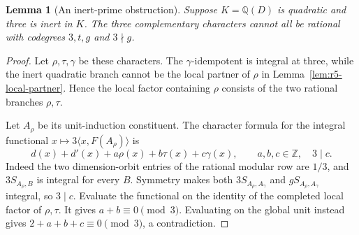 \documentclass[11pt,a4paper]{article}
\newtheorem{lemma}[theorem]{Lemma}
\numberwithin{equation}{section}
\begin{document}
\begin{lemma}[An inert-prime obstruction]
\label{lem:quadratic-inert-three}
Suppose $K=\mathbb Q(D)$ is quadratic and three is inert in $K$.
The three complementary characters cannot all be rational with
codegrees $3,t,g$ and $3\nmid g$.
\end{lemma}
\begin{proof}
Let $\rho,\tau,\gamma$ be these characters. The $\gamma$-idempotent
is integral at three, while the inert quadratic branch cannot be the
local partner of $\rho$ in Lemma~\ref{lem:r5-local-partner}.
Hence the local factor containing $\rho$ consists of the two rational
branches $\rho,\tau$.

Let $A_\rho$ be its unit-induction constituent. The character formula
for the integral functional $x\mapsto3\langle x,F(A_\rho)\rangle$ is
\[
 d(x)+d'(x)+a\rho(x)+b\tau(x)+c\gamma(x),
       \qquad a,b,c\in\mathbb Z,\quad 3\mid c.
\]
Indeed the two dimension-orbit entries of the rational modular row
are $1/3$, and $3S_{A_\rho,B}$ is integral for every $B$.
Symmetry makes both $3S_{A_\rho,A_\gamma}$ and
$gS_{A_\rho,A_\gamma}$ integral, so $3\mid c$.
Evaluate the functional on the identity of the completed local factor
of $\rho,\tau$. It gives $a+b\equiv0\pmod3$. Evaluating on the
global unit instead gives $2+a+b+c\equiv0\pmod3$, a contradiction.
\end{proof}
\end{document}

